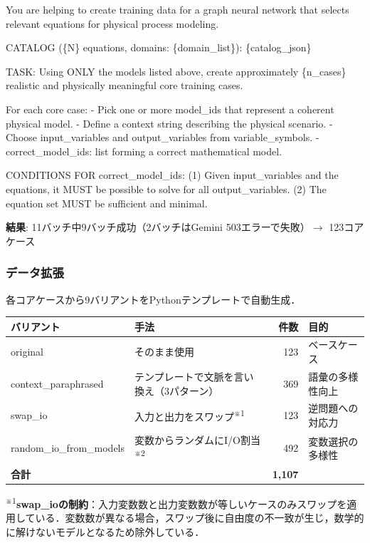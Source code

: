 \documentclass[11pt,a4paper]{ltjsarticle}
\begin{document}
\begin{promptbox}
You are helping to create training data for a graph neural network
that selects relevant equations for physical process modeling.

CATALOG (\{N\} equations, domains: \{domain\_list\}):
\{catalog\_json\}

TASK: Using ONLY the models listed above, create approximately
\{n\_cases\} realistic and physically meaningful core training cases.

For each core case:
- Pick one or more model\_ids that represent a coherent physical model.
- Define a context string describing the physical scenario.
- Choose input\_variables and output\_variables from variable\_symbols.
- correct\_model\_ids: list forming a correct mathematical model.

CONDITIONS FOR correct\_model\_ids:
(1) Given input\_variables and the equations, it MUST be possible
    to solve for all output\_variables.
(2) The equation set MUST be sufficient and minimal.
\end{promptbox}

\textbf{結果}: 11バッチ中9バッチ成功（2バッチはGemini 503エラーで失敗）$\to$ 123コアケース

\subsubsection{データ拡張}

各コアケースから9バリアントをPythonテンプレートで自動生成．

\begin{table}[h]
\centering
\begin{tabular}{llrl}
\toprule
バリアント & 手法 & 件数 & 目的 \\
\midrule
original & そのまま使用 & 123 & ベースケース \\
context\_paraphrased & テンプレートで文脈を言い換え（3パターン） & 369 & 語彙の多様性向上 \\
swap\_io & 入力と出力をスワップ\textsuperscript{※1} & 123 & 逆問題への対応力 \\
random\_io\_from\_models & 変数からランダムにI/O割当\textsuperscript{※2} & 492 & 変数選択の多様性 \\
\midrule
\textbf{合計} & & \textbf{1,107} & \\
\bottomrule
\end{tabular}
\end{table}

\textsuperscript{※1}\textbf{swap\_ioの制約}：入力変数数と出力変数数が等しいケースのみスワップを適用している．変数数が異なる場合，スワップ後に自由度の不一致が生じ，数学的に解けないモデルとなるため除外している．
\end{document}
